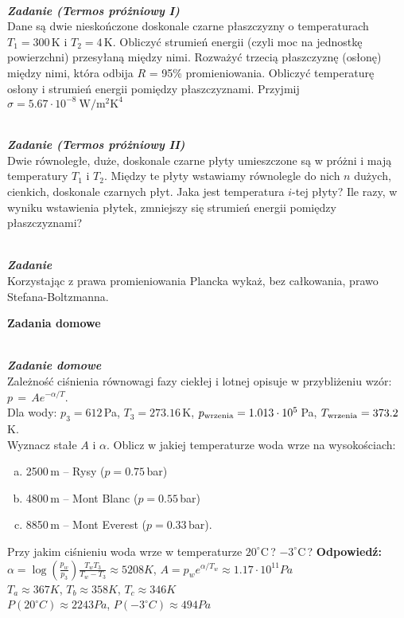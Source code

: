 \documentclass[11pt,a4paper]{article}
\newcounter{zadanie}\newcommand{\zadanie}[1][]{\addtocounter{zadanie}{1} ~\\  {\bf \emph{Zadanie \arabic{zadanie} #1 }} \\}
\newcounter{zaddom}\newcommand{\zaddom}[1][]{\addtocounter{zaddom}{1} ~\\  {\bf \emph{Zadanie domowe \arabic{zaddom} #1 }} \\}
\begin{document}
\zadanie [(Termos próżniowy I)]
Dane są dwie nieskończone doskonale czarne płaszczyzny o temperaturach $T_1=300\,$K i $T_2=4$\,K.
Obliczyć strumień energii (czyli moc na jednostkę powierzchni)
przesyłaną między nimi. Rozważyć trzecią płaszczyznę (osłonę)
między nimi, która odbija $R$ = 95\% promieniowania. 
Obliczyć temperaturę osłony i strumień energii pomiędzy płaszczyznami.
Przyjmij $\sigma = 5.67\cdot 10^{-8}~\mathrm{W/m^{2}K^{4}}$

\zadanie [(Termos próżniowy II)]
Dwie równoległe, duże, doskonale czarne płyty umieszczone są w próżni i mają temperatury $T_1$ i $T_2$.
Między te płyty wstawiamy równolegle do nich $n$ dużych, cienkich, doskonale czarnych płyt.
Jaka jest temperatura $i$-tej płyty? 
Ile razy, w wyniku wstawienia płytek, zmniejszy się strumień energii pomiędzy płaszczyznami? 


\zadanie
Korzystając z prawa promieniowania Plancka wykaż, bez całkowania, prawo Stefana-Boltzmanna.

\pagebreak
\begin{centering}
\bf{ Zadania domowe }\\[1mm]
\end{centering}
\vspace{1mm}

\zaddom
Zależność ciśnienia równowagi fazy ciekłej i lotnej opisuje 
w przybliżeniu wzór: $ p \,=\, A e^{-\alpha /T} $.\\
Dla wody: $p_3 = 612\,$Pa, $T_3 = 273.16\,$K, 
$p_{\rm wrzenia} = 1.013\cdot 10^5\,$Pa, 
$T_{\rm wrzenia} = 373.2\,$K.\\ 
Wyznacz stałe $A$ i $\alpha$.
Oblicz w jakiej temperaturze woda wrze na wysokościach:
\begin{enumerate}[a)] 
\item 2500\,m -- Rysy ($p = 0.75\,$bar)
\item 4800\,m -- Mont Blanc ($p = 0.55\,$bar)
\item 8850\,m -- Mont Everest ($p = 0.33\,$bar).
\end{enumerate}
Przy jakim ciśnieniu woda wrze w temperaturze $20^\circ$C\,? $-3^\circ$C\,?
\vskip 10pt
\textbf{Odpowiedź:}
 $\alpha = \log\left(\frac{p_w}{p_3}\right)\frac{T_wT_3}{T_w-T_3} \approx 5208 K$, $A= p_w e^{\alpha/T_w} \approx 1.17 \cdot 10^{11} Pa$\\
$T_a \approx 367 K$, $T_b \approx 358 K$, $T_c \approx 346 K$\\
$P(20^\circ C) \approx 2243 Pa$, $P(-3^\circ C) \approx 494 Pa$
\end{document}
